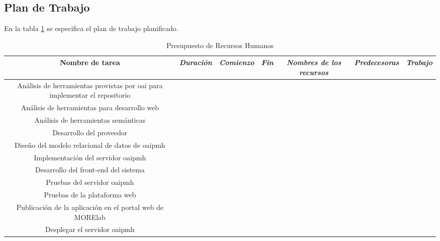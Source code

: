 \subsection{Plan de Trabajo}

En la tabla \ref{tab:work_plan} se especifica el plan de trabajo planificado.

\begin{table}[htp]
	\centering
	\caption{Presupuesto de Recursos Humanos}\label{tab:work_plan}
	\begin{tabular}{ccccccc}
		\toprule
    	\textbf{Nombre de tarea} & \emph{Duración} & \emph{Comienzo} & \emph{Fin} & \emph{Nombres de los recursos} & \emph{Predecesoras} & \emph{Trabajo}\\
    	\midrule
    	Análisis de herramientas provistas por \acrshort{oai} para implementar el repositorio\\
    	Análisis de herramientas para desarrollo web\\
    	Análisis de herramientas semánticas\\
    	Desarrollo del proveedor\\
    	Diseño del modelo relacional de datos de \acrshort{oaipmh}\\
    	Implementación del servidor \acrshort{oaipmh}\\
    	Desarrollo del front-end del sistema\\
    	Pruebas del servidor \acrshort{oaipmh}\\
    	Pruebas de la plataforma web\\
    	Publicación de la aplicación en el portal web de MORElab\\
    	Desplegar el servidor \acrshort{oaipmh}\\
    	\bottomrule
    \end{tabular}
\end{table}